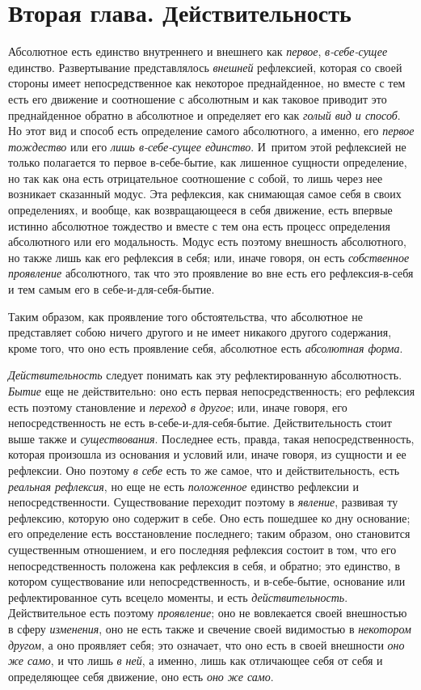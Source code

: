 \chapter[{\em Вторая глава} Действительность]{Вторая глава. Действительность}

Абсолютное есть единство внутреннего и внешнего
как {\em первое},
{\em в-себе-сущее} единство. Развертывание
представлялось {\em внешней} рефлексией, которая со
своей стороны имеет непосредственное как некоторое преднайденное, но вместе
с тем есть его движение и соотношение с абсолютным и как таковое приводит
это преднайденное обратно в абсолютное и определяет его как
{\em голый вид и способ}. Но этот вид и способ есть
определение самого абсолютного, а именно, его
{\em первое тождество} или его
{\em лишь в-себе-сущее единство}. И~притом этой
рефлексией не только полагается то первое в-себе-бытие, как лишенное
сущности определение, но так как она есть отрицательное соотношение с
собой, то лишь через нее возникает сказанный модус. Эта рефлексия, как
снимающая самое себя в своих определениях, и вообще, как возвращающееся в
себя движение, есть впервые истинно абсолютное тождество и вместе с тем она
есть процесс определения абсолютного или его модальность. Модус есть
поэтому внешность абсолютного, но также лишь как его рефлексия в себя; или,
иначе говоря, он есть {\em собственное проявление}
абсолютного, так что это проявление во вне есть его рефлексия-в-себя и тем
самым его в себе-и-для-себя-бытие.

Таким образом, как проявление того обстоятельства, что абсолютное не
представляет собою ничего другого и не имеет никакого другого содержания,
кроме того, что оно есть проявление себя, абсолютное есть
{\em абсолютная форма}.

{\em Действительность} следует понимать как эту
рефлектированную абсолютность. {\em Бытие} еще не
действительно: оно есть первая непосредственность; его рефлексия есть
поэтому становление и {\em переход в другое}; или,
иначе говоря, его непосредственность не есть в-себе-и-для-себя-бытие.
Действительность стоит выше также и
{\em существования}. Последнее есть, правда, такая
непосредственность, которая произошла из основания и условий или, иначе
говоря, из сущности и ее рефлексии. Оно поэтому
{\em в себе} есть то же самое, что и действительность,
есть {\em реальная рефлексия}, но еще не есть
{\em положенное} единство рефлексии и
непосредственности. Существование переходит поэтому в
{\em явление}, развивая ту рефлексию, которую оно
содержит в себе. Оно есть пошедшее ко дну основание; его определение есть
восстановление последнего; таким образом, оно становится существенным
отношением, и его последняя рефлексия состоит в том, что его
непосредственность положена как рефлексия в себя, и обратно; это единство,
в котором существование или непосредственность, и в-себе-бытие, основание
или рефлектированное суть всецело моменты, и есть
{\em действительность}. Действительное есть поэтому
{\em проявление}; оно не вовлекается своей внешностью в
сферу {\em изменения}, оно не есть также и свечение
своей видимостью в {\em некотором другом}, а оно
проявляет себя; это означает, что оно есть в своей внешности
{\em оно же само}, и что лишь
{\em в ней}, а именно, лишь как отличающее себя от себя
и определяющее себя движение, оно есть {\em оно же
само}.

